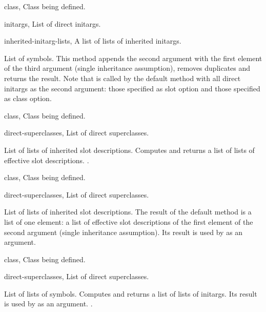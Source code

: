 \begin{optDefinition}
%
\begin{specargs}
    \item[class, \classref{class}] Class being defined.
    \item[initargs, \classref{list}] List of direct initargs.
    \item[inherited-initarg-lists, \classref{list}] A list of lists of inherited
    initargs.
\end{specargs}
%
\result%
List of symbols.
%
\remarks%
This method appends the second argument with the first element of the third
argument (single inheritance assumption), removes duplicates and returns the
result. Note that  is called by the default
 method with all direct initargs as the second argument:
those specified as slot option and those specified as class option.

%
\begin{genericargs}
    \item[class, \classref{class}] Class being defined.
    \item[direct-superclasses, \classref{list}] List of direct superclasses.
\end{genericargs}
%
\result%
List of lists of inherited slot descriptions.
%
\remarks%
Computes and returns a list of lists of effective slot descriptions.
%
\seealso%
.

%
\begin{specargs}
    \item[class, \classref{class}] Class being defined.
    \item[direct-superclasses, \classref{list}] List of direct superclasses.
\end{specargs}
%
\result%
List of lists of inherited slot descriptions.
%
\remarks%
The result of the default method is a list of one element: a list of effective
slot descriptions of the first element of the second argument (single
inheritance assumption). Its result is used by
 as an argument.

%
\begin{genericargs}
    \item[class, \classref{class}] Class being defined.
    \item[direct-superclasses, \classref{list}] List of direct superclasses.
\end{genericargs}
%
\result%
List of lists of symbols.
\remarks%
Computes and returns a list of lists of initargs. Its result is used by
 as an argument.
%
\seealso%
.


\end{optDefinition}
